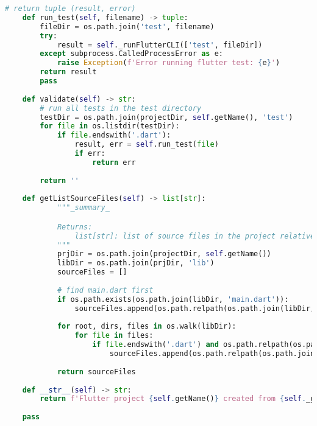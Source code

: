 \begin{lstlisting}[language=Python, caption={$\texttt{Flutter}$ class - subclass of Project.}, label={lst:2}]
    # return tuple (result, error)
    def run_test(self, filename) -> tuple:
        fileDir = os.path.join('test', filename)
        try:
            result = self._runFlutterCLI(['test', fileDir])
        except subprocess.CalledProcessError as e:
            raise Exception(f'Error running flutter test: {e}')
        return result
        pass
    
    def validate(self) -> str:
        # run all tests in the test directory
        testDir = os.path.join(projectDir, self.getName(), 'test')
        for file in os.listdir(testDir):
            if file.endswith('.dart'):
                result, err = self.run_test(file)
                if err:
                    return err
                
        return ''
    
    def getListSourceFiles(self) -> list[str]:
            """_summary_

            Returns:
                list[str]: list of source files in the project relative to project directory
            """
            prjDir = os.path.join(projectDir, self.getName())
            libDir = os.path.join(prjDir, 'lib') 
            sourceFiles = []
            
            # find main.dart first
            if os.path.exists(os.path.join(libDir, 'main.dart')):
                sourceFiles.append(os.path.relpath(os.path.join(libDir, 'main.dart'), prjDir))
            
            for root, dirs, files in os.walk(libDir):
                for file in files:
                    if file.endswith('.dart') and os.path.relpath(os.path.join(root, file), prjDir) not in sourceFiles:
                        sourceFiles.append(os.path.relpath(os.path.join(root, file), prjDir))
                        
            return sourceFiles
    
    def __str__(self) -> str:
        return f'Flutter project {self.getName()} created from {self._git_url}'
    
    pass
 \end{lstlisting}


